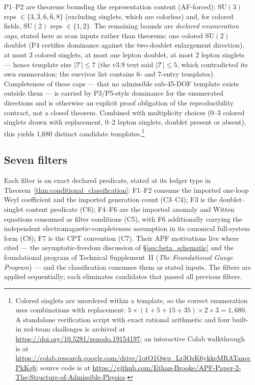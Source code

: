 \documentclass[11pt]{article}
\theoremstyle{definition}
\newcommand{\SU}{\mathrm{SU}}
\newcommand{\TSII}{Technical Supplement~II (\emph{The Foundational Gauge Program})}
\begin{document}
\noindent P1--P2 are theorems bounding the representation content
(AF-forced): $\SU(3)$ reps $\in \{3, \bar{3}, 6, \bar{6}, 8\}$
(excluding singlets, which are colorless) and, for colored fields,
$\SU(2)$ reps $\in \{1, 2\}$.  The remaining bounds are \emph{declared
enumeration caps}, stated here as scan inputs rather than theorems:
one colored $\SU(2)$ doublet (P4 certifies dominance against the
two-doublet enlargement direction), at most 3 colored singlets, at most one lepton
doublet, at most 2 lepton singlets --- hence template size
$|\mathcal{T}| \le 7$ (the v3.9 text said $|\mathcal{T}| \le 5$, which
contradicted its own enumeration: the survivor list contains 6- and
7-entry templates).  Completeness of these caps --- that no admissible
sub-45-DOF template exists outside them --- is carried by P3/P5-style
dominance for the enumerated directions and is otherwise an explicit
proof obligation of the reproducibility contract, not a closed
theorem.
Combined with multiplicity choices (0--3 colored singlets drawn
with replacement, 0--2 lepton singlets, doublet present or absent),
this yields 1{,}680 distinct candidate templates.\footnote{Colored
singlets are unordered within a template, so the correct enumeration
uses combinations with replacement: $5 \times (1 + 5 + 15 + 35)
\times 2 \times 3 = 1{,}680$.  A standalone verification script
with exact rational arithmetic and four built-in red-team challenges
is archived at \url{https://doi.org/10.5281/zenodo.19154197}; an
interactive Colab walkthrough is at
\url{https://colab.research.google.com/drive/1otO1Qwp_Lr3OsK6ykkeMRATanecPkKg6};
source code is at
\url{https://github.com/Ethan-Brooke/APF-Paper-2-The-Structure-of-Admissible-Physics}.}


\subsection{Seven filters}
\label{sec:seven_filters}

Each filter is an exact declared predicate, stated at its ledger type
in Theorem~\ref{thm:conditional_classification}: F1--F2 consume the
imported one-loop Weyl coefficient and the imported generation count
(C3--C4); F3 is the doublet--singlet content predicate (C6); F4--F6 are the imported
anomaly and Witten equations consumed as filter conditions (C5), with
F6 additionally carrying the independent electromagnetic-completeness
assumption in its canonical full-system form (C8); F7 is the CPT
convention (C7).  Their APF motivations live where cited --- the
asymptotic-freedom discussion of \S\ref{sec:beta_schematic} and the
foundational program of \TSII{} --- and the classification consumes
them as stated inputs.  The filters are applied sequentially; each
eliminates candidates that passed all previous filters.
\end{document}
